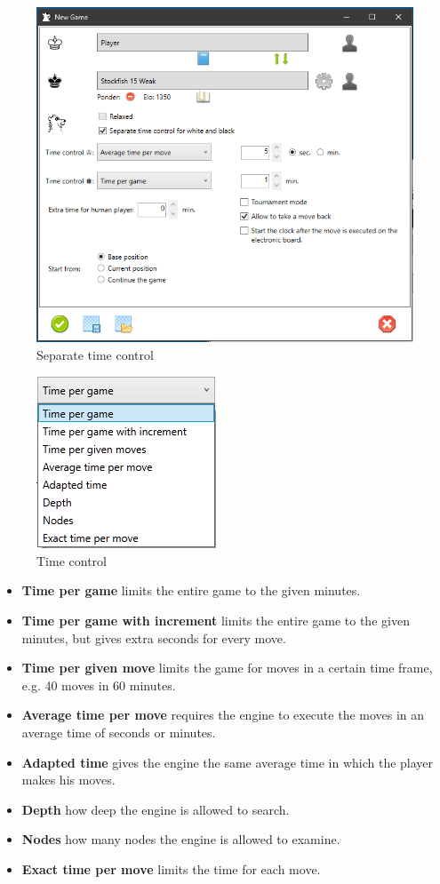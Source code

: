 \documentclass[11pt,a4paper]{article}
\begin{document}
\begin{figure}[H]
	\centering
	\includegraphics[scale=0.7]{NewGame3.png}
	\caption{Separate time control}
	\label{fig:NewGame3}
\end{figure}


\begin{figure}[H]
	\centering
	\includegraphics[scale=1.0]{TimeControl.png}
	\caption{Time control}
	\label{fig:TimeControl}
\end{figure}

\begin{itemize}
	\item \textbf{Time per game} limits the entire game to the given minutes.
	\item \textbf{Time per game with increment} limits the entire game to the given minutes, but gives extra seconds for every move.
	\item \textbf{Time per given move} limits the game for moves in a certain time frame, e.g. 40 moves in 60 minutes.
	\item \textbf{Average time per move} requires the engine to execute the moves in an average time of seconds or minutes.
	\item \textbf{Adapted time} gives the engine the same average time in which the player makes his moves.	
	\item \textbf{Depth} how deep the engine is allowed to search.	
	\item \textbf{Nodes} how many nodes the engine is allowed to examine.
    \item \textbf{Exact time per move} limits the time for each move.
\end{itemize}
\end{document}

